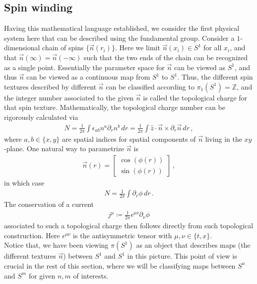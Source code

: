 \documentclass[11pt, onesided]{book}
\theoremstyle{break}
\theoremstyle{break}
\newcommand{\Z}{\mathbb{Z}}
\newcommand{\pd}{\partial}
\newcommand{\bmat}[1]{\begin{bmatrix} #1 \end{bmatrix}}
\begin{document}
\subsection{Spin winding}
Having this mathematical language established, we consider the first physical system here that can be described using the fundamental group. Consider a $1$-dimensional chain of spins $\{\vec{n}(r_i)\}$. Here we limit $\vec{n}(x_i) \in S^1$ for all $x_i$, and that $\vec{n}(\infty) = \vec{n}(-\infty)$ such that the two ends of the chain can be recognized as a single point. Essentially the parameter space for $\vec{n}$ can be viewed as $S^1$, and thus $\vec{n}$ can be viewed as a continuous map from $S^1$ to $S^1$. Thus, the different spin textures described by different $\vec{n}$ can be classified according to $\pi_1(S^1) = \Z$, and the integer number associated to the given $\vec{n}$ is called the topological charge for that spin texture. Mathematically, the topological charge number can be rigorously calculated via
\begin{align*}
N = \frac{1}{2\pi}\int \epsilon_{ab}n^a \pd_r n^b\, dr = \frac{1}{2\pi}\int \hat{z}\cdot \vec{n}\times \pd_r \vec{n}\, dr\,,
\end{align*}
where $a,b\in \{x,y\}$ are spatial indices for spatial components of $\vec{n}$ living in the $xy$-plane. One natural way to parametrize $\vec{n}$ is 
\begin{align*}
\vec{n}(r) = \bmat{\cos(\phi(r)) \\ \sin(\phi(r))}\,,
\end{align*}
in which case
\begin{align*}
N =\frac{1}{2\pi} \int \pd_r\phi \, dr\,.
\end{align*}
The conservation of a current 
\begin{align*}
j^\mu \coloneqq \frac{1}{2\pi} \epsilon^{\mu\nu}\pd_\nu \phi
\end{align*}
associated to such a topological charge then follows directly from such topological construction. Here $\epsilon^{\mu\nu}$ is the antisymmetric tensor with $\mu,\nu\in \{t,x\}$. \\

Notice that, we have been viewing $\pi(S^1)$ as an object that describes maps (the different textures $\vec{n}$) between $S^1$ and $S^1$ in this picture. This point of view is crucial in the rest of this section, where we will be classifying maps between $S^n$ and $S^m$ for given $n,m$ of interests. \\
\end{document}
